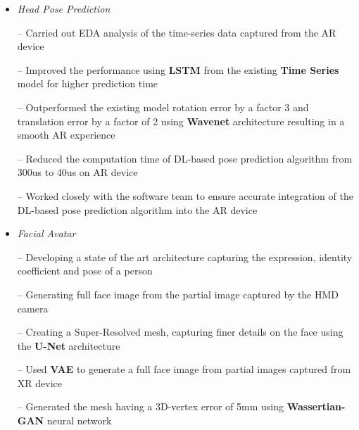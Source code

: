 \documentclass{article}
\begin{document}
\begin{itemize}
\setlength{\itemsep} {-0.2em}
 \item\textit{Head Pose Prediction}
 \item[--] Carried out EDA analysis of the time-series data captured from the AR device

\item[--] Improved the performance  using \textbf{LSTM} from the existing \textbf{Time Series} model for higher prediction time
\item[--] Outperformed the existing model rotation error by a factor 3 and translation error by a factor of 2 using \textbf{Wavenet} architecture
resulting in a smooth AR experience
\item[--] Reduced the computation time of  DL-based pose prediction algorithm  from 300us to 40us on AR device  
\item[--] Worked closely with the software team to ensure accurate integration of the DL-based pose prediction algorithm into the AR device
 \item\textit{Facial Avatar}
   \item[--] Developing a state of the art architecture capturing  the expression, identity coefficient and pose of a person
   \item[--] Generating full face image from the partial image captured by the HMD camera
   \item[--] Creating a Super-Resolved mesh, capturing finer details on the face using the \textbf{U-Net} architecture
  \item[--] Used \textbf{VAE}  to generate a full face image from partial images captured from XR device  
   \item[--] Generated the mesh having a 3D-vertex error of 5mm
   using \textbf{Wassertian-GAN} neural network
   
\end{itemize}
\end{document}
